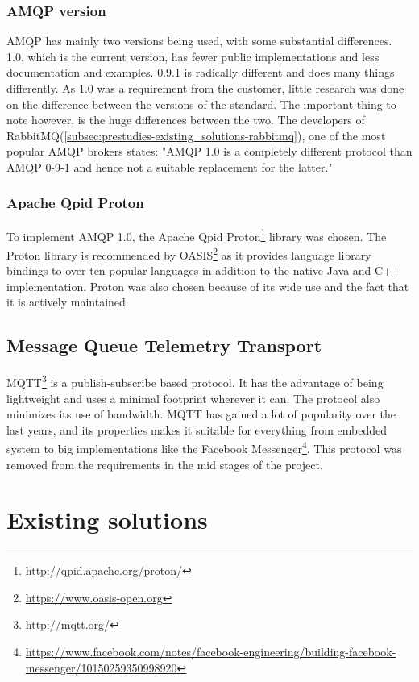 \subsubsection{AMQP version}
\label{subsec:prestudies-amqp-amqp_version}
AMQP has mainly two versions being used, with some substantial differences. 1.0, which is the current version, has fewer public implementations and less documentation and examples. 0.9.1 is radically different and does many things differently. As 1.0 was a requirement from the customer, little research was done on the difference between the versions of the standard. The important thing to note however, is the huge differences between the two. The developers of RabbitMQ(\ref{subsec:prestudies-existing_solutions-rabbitmq}), one of the most popular AMQP brokers states: "AMQP 1.0 is a completely different protocol than AMQP 0-9-1 and hence not a suitable replacement for the latter."

\subsubsection{Apache Qpid Proton}
To implement AMQP 1.0, the Apache Qpid Proton\footnote{\url{http://qpid.apache.org/proton/}} library was chosen. The Proton library is recommended by OASIS\footnote{\url{https://www.oasis-open.org}} as it provides language library bindings to over ten popular languages in addition to the native Java and C++ implementation. Proton was also chosen because of its wide use and the fact that it is actively maintained.

\subsection{Message Queue Telemetry Transport}
\label{subsec:prestudies-mqtt}
MQTT\footnote{\url{http://mqtt.org/}} is a publish-subscribe based protocol. It has the advantage of being lightweight and uses a minimal footprint wherever it can. The protocol also minimizes its use of bandwidth. MQTT has gained a lot of popularity over the last years, and its properties makes it suitable for everything from embedded system to big implementations like the Facebook Messenger\footnote{\url{https://www.facebook.com/notes/facebook-engineering/building-facebook-messenger/10150259350998920}}. This protocol was removed from the requirements in the mid stages of the project.

\section{Existing solutions}
\label{subsec:prestudies-existing_solutions}

